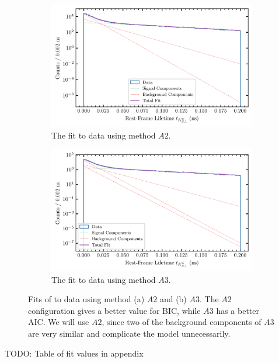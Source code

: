\begin{figure}
  \begin{center}
    \begin{subfigure}[t]{\textwidth}
        \begin{center}
          \includegraphics[width=.8\columnwidth]{figures/splot_fit_data_chisqdof_3.4_splot_D_1s_2b.png}
        \caption{The fit to data using method $A2$.}
        \end{center}
        \end{subfigure}
        \begin{subfigure}[t]{\textwidth}
          \begin{center}
            \includegraphics[width=.8\columnwidth]{figures/splot_fit_data_chisqdof_3.4_splot_D_1s_3b.png}
        \caption{The fit to data using method $A3$.}
          \end{center}
        \end{subfigure}
        \caption{Fits of  to data using method (a) $A2$ and (b) $A3$. The $A2$ configuration gives a better value for BIC, while $A3$ has a better AIC. We will use $A2$, since two of the background components of $A3$ are very similar and complicate the model unnecessarily.}\label{fig:splot-A2-A3}
\end{center}
\end{figure}
{\color{red}TODO: Table of fit values in appendix}

